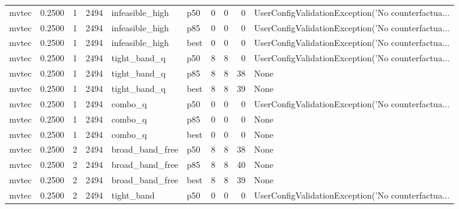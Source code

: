 \begin{tabular}{lrrrllrrrl}
   mvtec &    0.2500 &    1 &   2494 &      infeasible\_high &    p50 &               0 &          0 &       0 & UserConfigValidationException('No counterfactua... \\
   mvtec &    0.2500 &    1 &   2494 &      infeasible\_high &    p85 &               0 &          0 &       0 & UserConfigValidationException('No counterfactua... \\
   mvtec &    0.2500 &    1 &   2494 &      infeasible\_high &   best &               0 &          0 &       0 & UserConfigValidationException('No counterfactua... \\
   mvtec &    0.2500 &    1 &   2494 &         tight\_band\_q &    p50 &               8 &          8 &       0 & UserConfigValidationException('No counterfactua... \\
   mvtec &    0.2500 &    1 &   2494 &         tight\_band\_q &    p85 &               8 &          8 &      38 &                                               None \\
   mvtec &    0.2500 &    1 &   2494 &         tight\_band\_q &   best &               8 &          8 &      39 &                                               None \\
   mvtec &    0.2500 &    1 &   2494 &              combo\_q &    p50 &               0 &          0 &       0 & UserConfigValidationException('No counterfactua... \\
   mvtec &    0.2500 &    1 &   2494 &              combo\_q &    p85 &               0 &          0 &       0 &                                               None \\
   mvtec &    0.2500 &    1 &   2494 &              combo\_q &   best &               0 &          0 &       0 &                                               None \\
   mvtec &    0.2500 &    2 &   2494 &      broad\_band\_free &    p50 &               8 &          8 &      38 &                                               None \\
   mvtec &    0.2500 &    2 &   2494 &      broad\_band\_free &    p85 &               8 &          8 &      40 &                                               None \\
   mvtec &    0.2500 &    2 &   2494 &      broad\_band\_free &   best &               8 &          8 &      39 &                                               None \\
   mvtec &    0.2500 &    2 &   2494 &           tight\_band &    p50 &               0 &          0 &       0 & UserConfigValidationException('No counterfactua... \\

\end{tabular}
